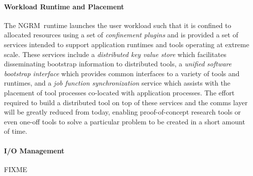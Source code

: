 \documentclass{article}
\newcommand{\ngrm}{NGRM}
\begin{document}
\paragraph{Workload Runtime and Placement}
The \ngrm\ runtime launches the user workload such that it is confined
to allocated resources using a set of {\em confinement plugins}
and is provided a set of services intended to support application
runtimes and tools operating at extreme scale.
These services include a {\em distributed key value store} which facilitates
disseminating bootstrap information to distributed tools,
a {\em unified software bootstrap interface} which provides common
interfaces to a variety of tools and runtimes, and
a {\em job function synchronization} service which assists with the placement
of tool processes co-located with application processes.
The effort required to build a distributed tool on top of these services
and the comms layer will be greatly reduced from today, enabling
proof-of-concept research tools or even one-off tools to solve a particular
problem to be created in a short amount of time.

\paragraph{I/O Management}
FIXME













\appendix







\end{document}
